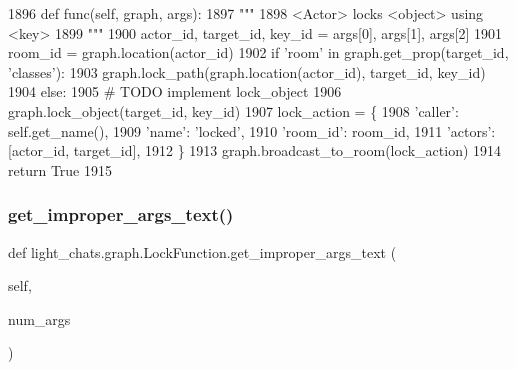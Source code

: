 \begin{DoxyCode}
1896     \textcolor{keyword}{def }func(self, graph, args):
1897         \textcolor{stringliteral}{"""}
1898 \textcolor{stringliteral}{        <Actor> locks <object> using <key>}
1899 \textcolor{stringliteral}{        """}
1900         actor\_id, target\_id, key\_id = args[0], args[1], args[2]
1901         room\_id = graph.location(actor\_id)
1902         \textcolor{keywordflow}{if} \textcolor{stringliteral}{'room'} \textcolor{keywordflow}{in} graph.get\_prop(target\_id, \textcolor{stringliteral}{'classes'}):
1903             graph.lock\_path(graph.location(actor\_id), target\_id, key\_id)
1904         \textcolor{keywordflow}{else}:
1905             \textcolor{comment}{# TODO implement lock\_object}
1906             graph.lock\_object(target\_id, key\_id)
1907         lock\_action = \{
1908             \textcolor{stringliteral}{'caller'}: self.get\_name(),
1909             \textcolor{stringliteral}{'name'}: \textcolor{stringliteral}{'locked'},
1910             \textcolor{stringliteral}{'room\_id'}: room\_id,
1911             \textcolor{stringliteral}{'actors'}: [actor\_id, target\_id],
1912         \}
1913         graph.broadcast\_to\_room(lock\_action)
1914         \textcolor{keywordflow}{return} \textcolor{keyword}{True}
1915 
\end{DoxyCode}
\mbox{\label{classlight__chats_1_1graph_1_1LockFunction_a816faf6314525be44d40024fd83d72d8}} 
\subsubsection{\texorpdfstring{get\+\_\+improper\+\_\+args\+\_\+text()}{get\_improper\_args\_text()}}
{\footnotesize\ttfamily def light\+\_\+chats.\+graph.\+Lock\+Function.\+get\+\_\+improper\+\_\+args\+\_\+text (\begin{DoxyParamCaption}\item[{}]{self,  }\item[{}]{num\+\_\+args }\end{DoxyParamCaption})}




